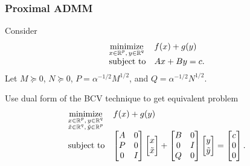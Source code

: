 \documentclass[10pt,mathserif]{beamer}
\begin{document}
\begin{frame}
\frametitle{Proximal ADMM}
Consider
\[
\begin{array}{ll}
\underset{\substack{x\in \mathbb{R}^p,\,y\in \mathbb{R}^q}}{\mbox{minimize}}&f(x)+g(y)\\
\mbox{subject to}&Ax+By=c.
\end{array}
\]
Let $M\succeq 0$, $N\succeq 0$, $P=\alpha^{-1/2}M^{1/2}$, and $Q=\alpha^{-1/2}N^{1/2}$.

\vspace{0.2in}


Use dual form of the BCV technique to get equivalent problem
\[
\begin{array}{ll}
\underset{\substack{x\in \mathbb{R}^p,\,y\in \mathbb{R}^q\\\tilde{x}\in \mathbb{R}^q,\,\tilde{y}\in \mathbb{R}^p}}{\mbox{minimize}}&f(x)+g(y)\\
\mbox{subject to}&
\begin{bmatrix}
A&0\\
P&0\\
0&I
\end{bmatrix}
\begin{bmatrix}
x\\
\tilde{x}
\end{bmatrix}+\begin{bmatrix}
B&0\\
0&I\\
Q&0
\end{bmatrix}
\begin{bmatrix}
y\\
\tilde{y}
\end{bmatrix}=
\begin{bmatrix}
c\\
0\\
0
\end{bmatrix}
.
\end{array}
\]
\end{frame}
\end{document}
